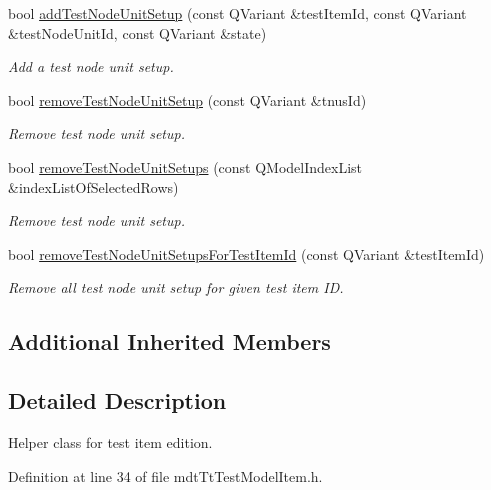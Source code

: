 \begin{DoxyCompactItemize}
bool \hyperlink{classmdt_tt_test_model_item_acac991609d4e4b39404cf1be14928947}{add\-Test\-Node\-Unit\-Setup} (const Q\-Variant \&test\-Item\-Id, const Q\-Variant \&test\-Node\-Unit\-Id, const Q\-Variant \&state)
\begin{DoxyCompactList}\small\item\em Add a test node unit setup. \end{DoxyCompactList}\item 
bool \hyperlink{classmdt_tt_test_model_item_a6424038eadcf2e2d11ee5aa269b562c7}{remove\-Test\-Node\-Unit\-Setup} (const Q\-Variant \&tnus\-Id)
\begin{DoxyCompactList}\small\item\em Remove test node unit setup. \end{DoxyCompactList}\item 
bool \hyperlink{classmdt_tt_test_model_item_a3e6d86258dde0d8cb0fb14e9195cabd9}{remove\-Test\-Node\-Unit\-Setups} (const Q\-Model\-Index\-List \&index\-List\-Of\-Selected\-Rows)
\begin{DoxyCompactList}\small\item\em Remove test node unit setup. \end{DoxyCompactList}\item 
bool \hyperlink{classmdt_tt_test_model_item_ac45849becd11e9206b2d696e0346ba71}{remove\-Test\-Node\-Unit\-Setups\-For\-Test\-Item\-Id} (const Q\-Variant \&test\-Item\-Id)
\begin{DoxyCompactList}\small\item\em Remove all test node unit setup for given test item I\-D. \end{DoxyCompactList}\end{DoxyCompactItemize}
\subsection*{Additional Inherited Members}


\subsection{Detailed Description}
Helper class for test item edition. 

Definition at line 34 of file mdt\-Tt\-Test\-Model\-Item.\-h.



